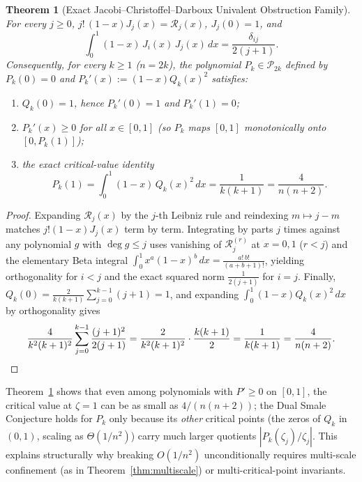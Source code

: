 \documentclass[11pt,a4paper]{article}
\newtheorem{theorem}{Theorem}[section]
\theoremstyle{definition}
\theoremstyle{remark}
\begin{document}
\begin{theorem}[Exact Jacobi--Christoffel--Darboux Univalent Obstruction Family]
\label{thm:jacobi}
For every $j \ge 0$, $j!\, (1 - x) J_j(x) = \mathcal{R}_j(x)$, $J_j(0) = 1$, and
\[
\int_0^1 (1 - x)\, J_i(x)\, J_j(x)\, dx = \frac{\delta_{ij}}{2(j + 1)}.
\]
Consequently, for every $k \ge 1$ ($n = 2k$), the polynomial $P_k \in \mathcal{P}_{2k}$ defined by $P_k(0) = 0$ and $P_k'(x) := (1 - x) Q_k(x)^2$ satisfies:
\begin{enumerate}
\item $Q_k(0) = 1$, hence $P_k'(0) = 1$ and $P_k'(1) = 0$;
\item $P_k'(x) \ge 0$ for all $x \in [0, 1]$ (so $P_k$ maps $[0, 1]$ monotonically onto $[0, P_k(1)]$);
\item the exact critical-value identity
\begin{equation}
\label{eq:jacobi-exact}
P_k(1) = \int_0^1 (1 - x)\, Q_k(x)^2\, dx = \frac{1}{k(k + 1)} = \frac{4}{n(n + 2)}.
\end{equation}
\end{enumerate}
\end{theorem}

\begin{proof}
Expanding $\mathcal{R}_j(x)$ by the $j$-th Leibniz rule and reindexing $m \mapsto j - m$ matches $j!(1 - x) J_j(x)$ term by term. Integrating by parts $j$ times against any polynomial $g$ with $\deg g \le j$ uses vanishing of $\mathcal{R}_j^{(r)}$ at $x = 0, 1$ ($r < j$) and the elementary Beta integral $\int_0^1 x^a (1 - x)^b\, dx = \frac{a!\, b!}{(a + b + 1)!}$, yielding orthogonality for $i < j$ and the exact squared norm $\frac{1}{2(j + 1)}$ for $i = j$. Finally, $Q_k(0) = \frac{2}{k(k+1)} \sum_{j=0}^{k-1} (j + 1) = 1$, and expanding $\int_0^1 (1 - x) Q_k(x)^2\, dx$ by orthogonality gives
\[
\frac{4}{k^2 (k + 1)^2} \sum_{j=0}^{k-1} \frac{(j + 1)^2}{2(j + 1)} = \frac{2}{k^2 (k + 1)^2} \cdot \frac{k(k + 1)}{2} = \frac{1}{k(k + 1)} = \frac{4}{n(n + 2)}. \qedhere
\]
\end{proof}

Theorem~\ref{thm:jacobi} shows that even among polynomials with $P' \ge 0$ on $[0, 1]$, the critical value at $\zeta = 1$ can be as small as $4/(n(n+2))$; the Dual Smale Conjecture holds for $P_k$ only because its \emph{other} critical points (the zeros of $Q_k$ in $(0, 1)$, scaling as $\Theta(1/n^2)$) carry much larger quotients $|P_k(\zeta_j)/\zeta_j|$. This explains structurally why breaking $O(1/n^2)$ unconditionally requires multi-scale confinement (as in Theorem~\ref{thm:multiscale}) or multi-critical-point invariants.
\end{document}
